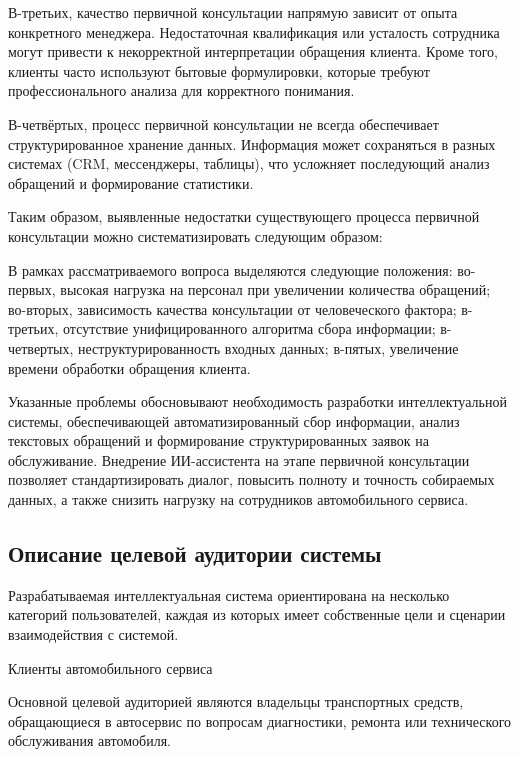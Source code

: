 \documentclass[14pt,a4paper]{extarticle}
\numberwithin{figure}{section}
\numberwithin{table}{section}
\begin{document}
В-третьих, качество первичной консультации напрямую зависит от опыта
конкретного менеджера. Недостаточная квалификация или усталость
сотрудника могут привести к некорректной интерпретации обращения
клиента. Кроме того, клиенты часто используют бытовые формулировки,
которые требуют профессионального анализа для корректного понимания.

В-четвёртых, процесс первичной консультации не всегда обеспечивает
структурированное хранение данных. Информация может сохраняться в разных
системах (CRM, мессенджеры, таблицы), что усложняет последующий анализ
обращений и формирование статистики.

Таким образом, выявленные недостатки существующего процесса первичной
консультации можно систематизировать следующим образом:


В рамках рассматриваемого вопроса выделяются следующие положения: во-первых, высокая нагрузка на персонал при увеличении количества обращений; во-вторых, зависимость качества консультации от человеческого фактора; в-третьих, отсутствие унифицированного алгоритма сбора информации; в-четвертых, неструктурированность входных данных; в-пятых, увеличение времени обработки обращения клиента.


Указанные проблемы обосновывают необходимость разработки
интеллектуальной системы, обеспечивающей автоматизированный сбор
информации, анализ текстовых обращений и формирование структурированных
заявок на обслуживание. Внедрение ИИ-ассистента на этапе первичной
консультации позволяет стандартизировать диалог, повысить полноту и
точность собираемых данных, а также снизить нагрузку на сотрудников
автомобильного сервиса.

\subsection{Описание целевой аудитории
системы}\label{ux43eux43fux438ux441ux430ux43dux438ux435-ux446ux435ux43bux435ux432ux43eux439-ux430ux443ux434ux438ux442ux43eux440ux438ux438-ux441ux438ux441ux442ux435ux43cux44b}

Разрабатываемая интеллектуальная система ориентирована на несколько
категорий пользователей, каждая из которых имеет собственные цели и
сценарии взаимодействия с системой.

Клиенты автомобильного сервиса

Основной целевой аудиторией являются владельцы транспортных средств,
обращающиеся в автосервис по вопросам диагностики, ремонта или
технического обслуживания автомобиля.
\end{document}
